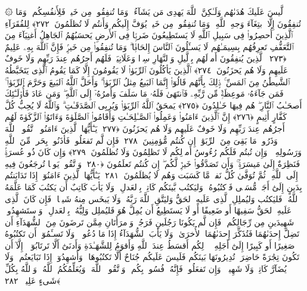  ۞ لَّيسَ عَلَيكَ هُدَىٰهُم وَلَـٰكِنَّ ٱللَّهَ يَهدِى مَن يَشَآءُ ۗ وَمَا تُنفِقُوا۟ مِن خَيرٍۢ فَلِأَنفُسِكُم ۚ وَمَا تُنفِقُونَ إِلَّا ٱبتِغَآءَ وَجهِ ٱللَّهِ ۚ وَمَا تُنفِقُوا۟ مِن خَيرٍۢ يُوَفَّ إِلَيكُم وَأَنتُم لَا تُظلَمُونَ ﴿٢٧٢﴾
 لِلفُقَرَآءِ ٱلَّذِينَ أُحصِرُوا۟ فِى سَبِيلِ ٱللَّهِ لَا يَستَطِيعُونَ ضَربًۭا فِى ٱلأَرضِ يَحسَبُهُمُ ٱلجَاهِلُ أَغنِيَآءَ مِنَ ٱلتَّعَفُّفِ تَعرِفُهُم بِسِيمَـٰهُم لَا يَسـَٔلُونَ ٱلنَّاسَ إِلحَافًۭا ۗ وَمَا تُنفِقُوا۟ مِن خَيرٍۢ فَإِنَّ ٱللَّهَ بِهِۦ عَلِيمٌ ﴿٢٧٣﴾
 ٱلَّذِينَ يُنفِقُونَ أَموَٟلَهُم بِٱلَّيلِ وَٱلنَّهَارِ سِرًّۭا وَعَلَانِيَةًۭ فَلَهُم أَجرُهُم عِندَ رَبِّهِم وَلَا خَوفٌ عَلَيهِم وَلَا هُم يَحزَنُونَ ﴿٢٧٤﴾
 ٱلَّذِينَ يَأكُلُونَ ٱلرِّبَوٰا۟ لَا يَقُومُونَ إِلَّا كَمَا يَقُومُ ٱلَّذِى يَتَخَبَّطُهُ ٱلشَّيطَٰنُ مِنَ ٱلمَسِّ ۚ ذَٟلِكَ بِأَنَّهُم قَالُوٓا۟ إِنَّمَا ٱلبَيعُ مِثلُ ٱلرِّبَوٰا۟ ۗ وَأَحَلَّ ٱللَّهُ ٱلبَيعَ وَحَرَّمَ ٱلرِّبَوٰا۟ ۚ فَمَن جَآءَهُۥ مَوعِظَةٌۭ مِّن رَّبِّهِۦ فَٱنتَهَىٰ فَلَهُۥ مَا سَلَفَ وَأَمرُهُۥٓ إِلَى ٱللَّهِ ۖ وَمَن عَادَ فَأُو۟لَـٰٓئِكَ أَصحَـٰبُ ٱلنَّارِ ۖ هُم فِيهَا خَـٰلِدُونَ ﴿٢٧٥﴾
 يَمحَقُ ٱللَّهُ ٱلرِّبَوٰا۟ وَيُربِى ٱلصَّدَقَـٰتِ ۗ وَٱللَّهُ لَا يُحِبُّ كُلَّ كَفَّارٍ أَثِيمٍ ﴿٢٧٦﴾
 إِنَّ ٱلَّذِينَ ءَامَنُوا۟ وَعَمِلُوا۟ ٱلصَّـٰلِحَـٰتِ وَأَقَامُوا۟ ٱلصَّلَوٰةَ وَءَاتَوُا۟ ٱلزَّكَوٰةَ لَهُم أَجرُهُم عِندَ رَبِّهِم وَلَا خَوفٌ عَلَيهِم وَلَا هُم يَحزَنُونَ ﴿٢٧٧﴾
 يَـٰٓأَيُّهَا ٱلَّذِينَ ءَامَنُوا۟ ٱتَّقُوا۟ ٱللَّهَ وَذَرُوا۟ مَا بَقِىَ مِنَ ٱلرِّبَوٰٓا۟ إِن كُنتُم مُّؤمِنِينَ ﴿٢٧٨﴾
 فَإِن لَّم تَفعَلُوا۟ فَأذَنُوا۟ بِحَربٍۢ مِّنَ ٱللَّهِ وَرَسُولِهِۦ ۖ وَإِن تُبتُم فَلَكُم رُءُوسُ أَموَٟلِكُم لَا تَظلِمُونَ وَلَا تُظلَمُونَ ﴿٢٧٩﴾
 وَإِن كَانَ ذُو عُسرَةٍۢ فَنَظِرَةٌ إِلَىٰ مَيسَرَةٍۢ ۚ وَأَن تَصَدَّقُوا۟ خَيرٌۭ لَّكُم ۖ إِن كُنتُم تَعلَمُونَ ﴿٢٨٠﴾
 وَٱتَّقُوا۟ يَومًۭا تُرجَعُونَ فِيهِ إِلَى ٱللَّهِ ۖ ثُمَّ تُوَفَّىٰ كُلُّ نَفسٍۢ مَّا كَسَبَت وَهُم لَا يُظلَمُونَ ﴿٢٨١﴾
 يَـٰٓأَيُّهَا ٱلَّذِينَ ءَامَنُوٓا۟ إِذَا تَدَايَنتُم بِدَينٍ إِلَىٰٓ أَجَلٍۢ مُّسَمًّۭى فَٱكتُبُوهُ ۚ وَليَكتُب بَّينَكُم كَاتِبٌۢ بِٱلعَدلِ ۚ وَلَا يَأبَ كَاتِبٌ أَن يَكتُبَ كَمَا عَلَّمَهُ ٱللَّهُ ۚ فَليَكتُب وَليُملِلِ ٱلَّذِى عَلَيهِ ٱلحَقُّ وَليَتَّقِ ٱللَّهَ رَبَّهُۥ وَلَا يَبخَس مِنهُ شَيـًۭٔا ۚ فَإِن كَانَ ٱلَّذِى عَلَيهِ ٱلحَقُّ سَفِيهًا أَو ضَعِيفًا أَو لَا يَستَطِيعُ أَن يُمِلَّ هُوَ فَليُملِل وَلِيُّهُۥ بِٱلعَدلِ ۚ وَٱستَشهِدُوا۟ شَهِيدَينِ مِن رِّجَالِكُم ۖ فَإِن لَّم يَكُونَا رَجُلَينِ فَرَجُلٌۭ وَٱمرَأَتَانِ مِمَّن تَرضَونَ مِنَ ٱلشُّهَدَآءِ أَن تَضِلَّ إِحدَىٰهُمَا فَتُذَكِّرَ إِحدَىٰهُمَا ٱلأُخرَىٰ ۚ وَلَا يَأبَ ٱلشُّهَدَآءُ إِذَا مَا دُعُوا۟ ۚ وَلَا تَسـَٔمُوٓا۟ أَن تَكتُبُوهُ صَغِيرًا أَو كَبِيرًا إِلَىٰٓ أَجَلِهِۦ ۚ ذَٟلِكُم أَقسَطُ عِندَ ٱللَّهِ وَأَقوَمُ لِلشَّهَـٰدَةِ وَأَدنَىٰٓ أَلَّا تَرتَابُوٓا۟ ۖ إِلَّآ أَن تَكُونَ تِجَٰرَةً حَاضِرَةًۭ تُدِيرُونَهَا بَينَكُم فَلَيسَ عَلَيكُم جُنَاحٌ أَلَّا تَكتُبُوهَا ۗ وَأَشهِدُوٓا۟ إِذَا تَبَايَعتُم ۚ وَلَا يُضَآرَّ كَاتِبٌۭ وَلَا شَهِيدٌۭ ۚ وَإِن تَفعَلُوا۟ فَإِنَّهُۥ فُسُوقٌۢ بِكُم ۗ وَٱتَّقُوا۟ ٱللَّهَ ۖ وَيُعَلِّمُكُمُ ٱللَّهُ ۗ وَٱللَّهُ بِكُلِّ شَىءٍ عَلِيمٌۭ ﴿٢٨٢﴾
